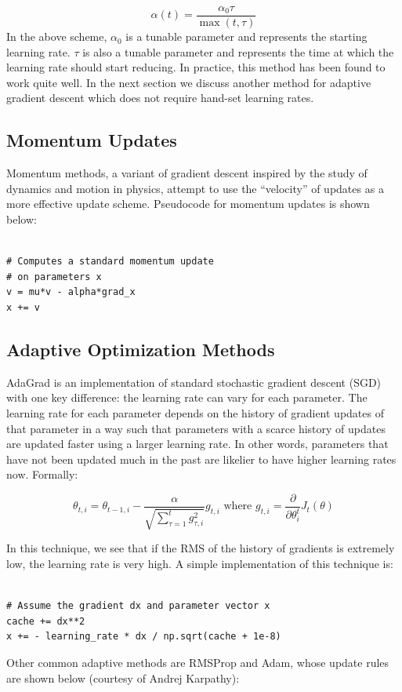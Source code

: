 \documentclass{tufte-handout}
\begin{document}
$$ \alpha(t) = \frac{\alpha_0\tau}{\max(t, \tau)}$$
In the above scheme, $\alpha_0$ is a tunable parameter and represents the starting learning rate. $\tau$ is also a tunable parameter and represents the time at which the learning rate should start reducing. In practice, this method has been found to work quite well. In the next section we discuss another method for adaptive gradient descent which does not require hand-set learning rates.


\subsection{Momentum Updates}

Momentum methods, a variant of gradient descent inspired by the study of dynamics and motion in physics, attempt to use the ``velocity'' of updates as a more effective update scheme. Pseudocode for momentum updates is shown below:

\begin{theorem}
\begin{verbatim}

# Computes a standard momentum update
# on parameters x
v = mu*v - alpha*grad_x
x += v
\end{verbatim}
\label{snip:momentup}
\end{theorem}


\subsection{Adaptive Optimization Methods}

AdaGrad is an implementation of standard stochastic gradient descent (SGD) with one key difference: the learning rate can vary for each parameter. The learning rate for each parameter depends on the history of gradient updates of that parameter in a way such that parameters with a scarce history of updates are updated faster using a larger learning rate. In other words, parameters that have not been updated much in the past are likelier to have higher learning rates now. Formally:

$$\theta_{t,i} = \theta_{t-1,i}  - \frac{\alpha}{\sqrt{\sum_{\tau=1}^{t} g_{\tau , i}^2}} g_{t,i} \text{ where } g_{t,i} = \frac{\partial}{\partial \theta_i^t}J_t(\theta) $$

In this technique, we see that if the RMS of the history of gradients is extremely low, the learning rate is very high. A simple implementation of this technique is:
\begin{theorem}
\begin{verbatim}

# Assume the gradient dx and parameter vector x
cache += dx**2
x += - learning_rate * dx / np.sqrt(cache + 1e-8)
\end{verbatim}
\label{snip:adagrad}
\end{theorem}
Other common adaptive methods are RMSProp and Adam, whose update rules are shown below (courtesy of Andrej Karpathy):
\end{document}
